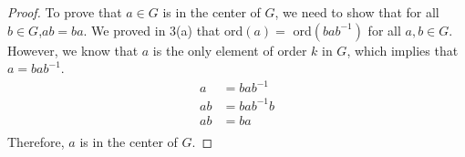 \documentclass[12pt]{article}
\begin{document}
\begin{enumerate}
		\begin{proof}
			To prove that $a\in G$ is in the center of $G$, we need to show that for all $b\in G$,$ab = ba$.
			We proved in 3(a) that 	 ord$(a) = $ ord$(bab^{-1})$ for all $a,b \in G$. However, we know that $a$ is the only element of order $k$ in $G$, which implies that $a=bab^{-1}$. 
			\begin{align*}
				a&=bab^{-1}\\
				ab&=bab^{-1}b\\
				ab&=ba\\
			\end{align*}
			Therefore, $a$ is in the center of $G$.
		\end{proof}
		
	\end{enumerate}
\end{document}
